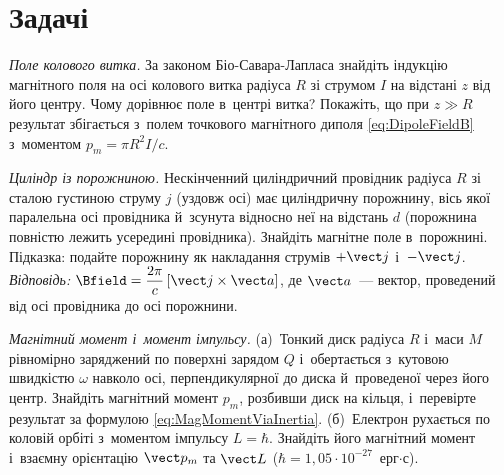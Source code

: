 \section*{Задачі}
 {}



\begin{problem}\label{prb:LoopAxisField}
	\emph{Поле колового витка.} За законом Біо-Савара-Лапласа знайдіть індукцію
	магнітного поля на осі колового витка радіуса $R$ зі струмом $I$ на відстані $z$ від
	його центру. Чому дорівнює поле в~центрі витка? Покажіть, що при $z\gg R$ результат
	збігається з~полем точкового магнітного диполя \eqref{eq:DipoleFieldB} з~моментом
	$p_m=\pi R^2I/c$.
\end{problem}

\begin{problem}\label{prb:CylinderCavity}
	\emph{Циліндр із порожниною.} Нескінченний циліндричний провідник радіуса $R$ зі
	сталою густиною струму $j$ (уздовж осі) має циліндричну порожнину, вісь якої
	паралельна осі провідника й~зсунута відносно неї на відстань $d$ (порожнина повністю
	лежить усередині провідника). Знайдіть магнітне поле в~порожнині. Підказка: подайте
	порожнину як накладання струмів $+\vect j$ і~$-\vect j$. \emph{Відповідь:}
	$\Bfield=\dfrac{2\pi}{c}\,[\vect j\times\vect a]$, де $\vect a$~--- вектор, проведений
	від осі провідника до осі порожнини.
\end{problem}

\begin{problem}\label{prb:RotatingDiskMoment}
	\emph{Магнітний момент і~момент імпульсу.} (а)~Тонкий диск радіуса $R$ і~маси $M$
	рівномірно заряджений по поверхні зарядом $Q$ і~обертається з~кутовою швидкістю
	$\omega$ навколо осі, перпендикулярної до диска й~проведеної через його центр.
	Знайдіть магнітний момент $p_m$, розбивши диск на кільця, і~перевірте результат за
	формулою \eqref{eq:MagMomentViaInertia}. (б)~Електрон рухається по коловій орбіті
	з~моментом імпульсу $L=\hbar$. Знайдіть його магнітний момент і~взаємну орієнтацію
	$\vect p_m$ та $\vect L$ ($\hbar=1{,}05\cdot10^{-27}$~ерг$\cdot$с).
\end{problem}

